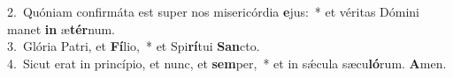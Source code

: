 {2.~}Quóniam confirmáta est super nos misericórdia \textbf{e}jus:~* et véritas Dómini manet \textbf{in} æ\textbf{tér}num.\\
{3.~}Glória Patri, et \textbf{Fí}lio,~* et Spi\textbf{rí}tui \textbf{San}cto.\\
{4.~}Sicut erat in princípio, et nunc, et \textbf{sem}per,~* et in sǽcula sæcu\textbf{ló}rum. \textbf{A}men.\\
